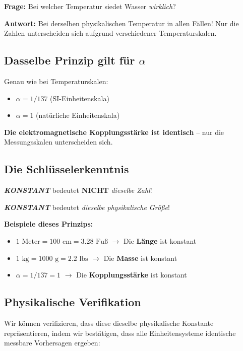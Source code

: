 	\textbf{Frage:} Bei welcher Temperatur siedet Wasser \textit{wirklich}?
	
	\textbf{Antwort:} Bei derselben physikalischen Temperatur in allen Fällen! Nur die Zahlen unterscheiden sich aufgrund verschiedener Temperaturskalen.
	
	\subsection{Dasselbe Prinzip gilt für $\alpha$}
	
	Genau wie bei Temperaturskalen:
	\begin{itemize}
		\item $\alpha = 1/137$ (SI-Einheitenskala)
		\item $\alpha = 1$ (natürliche Einheitenskala)
	\end{itemize}
	
	\textbf{Die elektromagnetische Kopplungsstärke ist identisch} -- nur die Messungsskalen unterscheiden sich.
	
	\subsection{Die Schlüsselerkenntnis}
	
	\begin{tcolorbox}[colback=yellow!5!white,colframe=orange!75!black,title=Fundamentales Prinzip]
		\textit{\textbf{KONSTANT}} bedeutet \textbf{NICHT} \textit{dieselbe Zahl}!
		
		\textit{\textbf{KONSTANT}} bedeutet \textit{dieselbe physikalische Größe}!
	\end{tcolorbox}
	
	\textbf{Beispiele dieses Prinzips:}
	\begin{itemize}
		\item $1\text{ Meter} = 100\text{ cm} = 3.28\text{ Fuß}$ $\rightarrow$ Die \textbf{Länge} ist konstant
		\item $1\text{ kg} = 1000\text{ g} = 2.2\text{ lbs}$ $\rightarrow$ Die \textbf{Masse} ist konstant
		\item $\alpha = 1/137 = 1$ $\rightarrow$ Die \textbf{Kopplungsstärke} ist konstant
	\end{itemize}
	
	\subsection{Physikalische Verifikation}
	
	Wir können verifizieren, dass diese dieselbe physikalische Konstante repräsentieren, indem wir bestätigen, dass alle Einheitensysteme identische messbare Vorhersagen ergeben:
	
